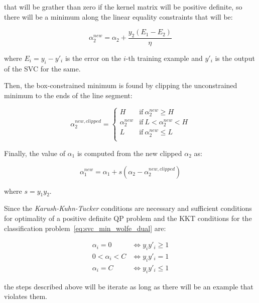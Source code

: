 that will be grather than zero if the kernel matrix will be positive definite, so there will be a minimum along the linear equality constraints that will be:

\begin{equation} \label{eq:smo_svc_a2_new}
	\alpha_2^{new} = \alpha_2 + \frac{y_2(E_1 - E_2)}{\eta}
\end{equation}

where $E_i = y_i - y'_i$ is the error on the $i$-th training example and $y'_i$ is the output of the SVC for the same.

Then, the box-constrained minimum is found by clipping the unconstrained minimum to the ends of the line segment:

\begin{equation} \label{eq:smo_svc_a2_new_clipped}
    \alpha_2^{new,clipped} =
        \begin{cases}
            H & \text{if} \ \alpha_2^{new} \geq H \\
            \alpha_2^{new} & \text{if} \ L < \alpha_2^{new} < H \\
            L & \text{if} \ \alpha_2^{new} \leq L \\
        \end{cases}
\end{equation}

Finally, the value of $\alpha_1$ is computed from the new clipped $\alpha_2$ as:

\begin{equation} \label{eq:smo_svc_a1_new}
	\alpha_1^{new} = \alpha_1 + s (\alpha_2 - \alpha_2^{new,clipped})
\end{equation}

where $s = y_1 y_2$.

Since the \emph{Karush-Kuhn-Tucker} conditions are necessary and sufficient conditions for optimality of a positive definite QP problem and the KKT conditions for the classification problem~\eqref{eq:svc_min_wolfe_dual} are:

\begin{equation} \label{eq:svc_smo_kkt}
	\begin{aligned}
		\alpha_i = 0 & \Leftrightarrow y_i y'_i \geq 1 \\
		0 < \alpha_i < C & \Leftrightarrow y_i y'_i = 1 \\
		\alpha_i = C & \Leftrightarrow y_i y'_i \leq 1
	\end{aligned}
\end{equation}

the steps described above will be iterate as long as there will be an example that violates them.

